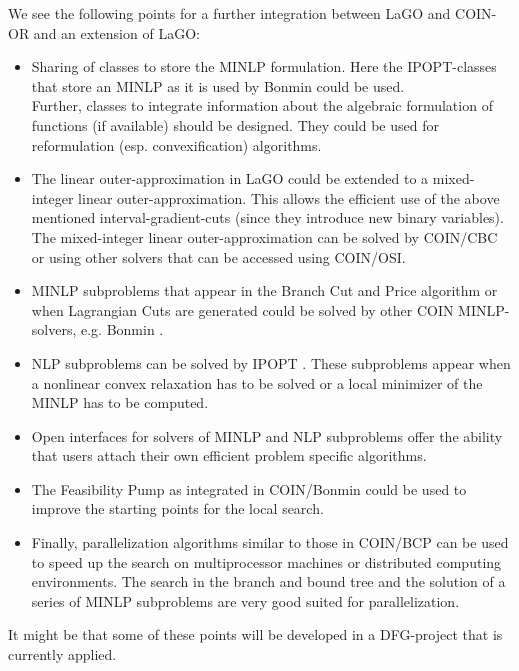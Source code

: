 \documentclass[11pt]{article}
\begin{document}
We see the following points for a further integration between LaGO and COIN-OR and an extension of LaGO:
\begin{itemize}
\item Sharing of classes to store the MINLP formulation.
Here the IPOPT-classes that store an MINLP as it is used by Bonmin could be used.\\
Further, classes to integrate information about the algebraic formulation of functions (if available) should be designed.
They could be used for reformulation (esp. convexification) algorithms.
\item The linear outer-approximation in LaGO could be extended to a mixed-integer linear outer-approximation. This allows the efficient use of the above mentioned interval-gradient-cuts (since they introduce new binary variables).\\
The mixed-integer linear outer-approximation can be solved by COIN/CBC or using other solvers that can be accessed using COIN/OSI.
\item MINLP subproblems that appear in the Branch Cut and Price algorithm or when Lagrangian Cuts are generated could be solved by other COIN MINLP-solvers, e.g. Bonmin \cite{BBCCGLLLMSW}.
\item NLP subproblems can be solved by IPOPT \cite{WaBi06}. These subproblems appear when a nonlinear convex relaxation has to be solved or a local minimizer of the MINLP has to be computed.
\item Open interfaces for solvers of MINLP and NLP subproblems offer the ability that users attach their own efficient problem specific algorithms.
\item The Feasibility Pump \cite{BoCoLoMa06} as integrated in COIN/Bonmin could be used to improve the starting points for the local search.
\item Finally, parallelization algorithms similar to those in COIN/BCP can be used to speed up the search on multiprocessor machines or distributed computing environments. The search in the branch and bound tree and the solution of a series of MINLP subproblems are very good suited for parallelization.
\end{itemize}
It might be that some of these points will be developed in a DFG-project that is currently  applied.
\end{document}

